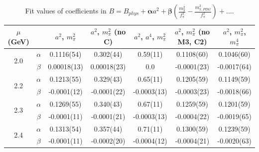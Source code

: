\documentclass[12pt]{extarticle}
\begin{document}
\begin{table}[h!]
\begin{center}
\begin{tabular}{|c c|c|c|c|c|c|}
\hline
$\mu$ (GeV) &  & $a^2$, $m_\pi^2$& $a^2$, $m_\pi^2$ (no C)& $a^2$, $a^4$, $m_\pi^2$& $a^2$, $m_\pi^2$ (no M3, C2)& $a^2$, $m_\pi^2$, $m_\pi^4$\\
\hline
\multirow{2}{0.5in}{2.0} & $\alpha$ & 0.1116(54)& 0.302(44)& 0.59(11)& 0.1108(60)& 0.1046(60)\\
 & $\beta$ & 0.00018(13)& 0.00018(23)& 0.0& -0.0001(23)& -0.0017(64)\\
\hline
\multirow{2}{0.5in}{2.2} & $\alpha$ & 0.1213(55)& 0.329(43)& 0.65(11)& 0.1205(59)& 0.1149(59)\\
 & $\beta$ & -0.0001(12)& -0.0001(22)& -0.0003(13)& -0.0003(23)& -0.0018(66)\\
\hline
\multirow{2}{0.5in}{2.3} & $\alpha$ & 0.1269(55)& 0.340(43)& 0.67(11)& 0.1259(59)& 0.1201(59)\\
 & $\beta$ & -0.0001(11)& -0.0001(21)& -0.0003(13)& -0.0004(22)& -0.0019(65)\\
\hline
\multirow{2}{0.5in}{2.4} & $\alpha$ & 0.1313(54)& 0.357(44)& 0.71(11)& 0.1300(59)& 0.1239(59)\\
 & $\beta$ & -0.0001(11)& -0.0002(20)& -0.0004(12)& -0.0004(21)& -0.0020(63)\\
\hline
\end{tabular}
\caption{Fit values of coefficients in $B = B_{phys} + \mathbf{\alpha} a^2 + \mathbf{\beta}\left(\frac{m_\pi^2}{f_\pi^2}-\frac{m_{\pi,PDG}^2}{f_\pi^2}\right) + \ldots$.}
\end{center}
\end{table}




















\clearpage
\end{document}
